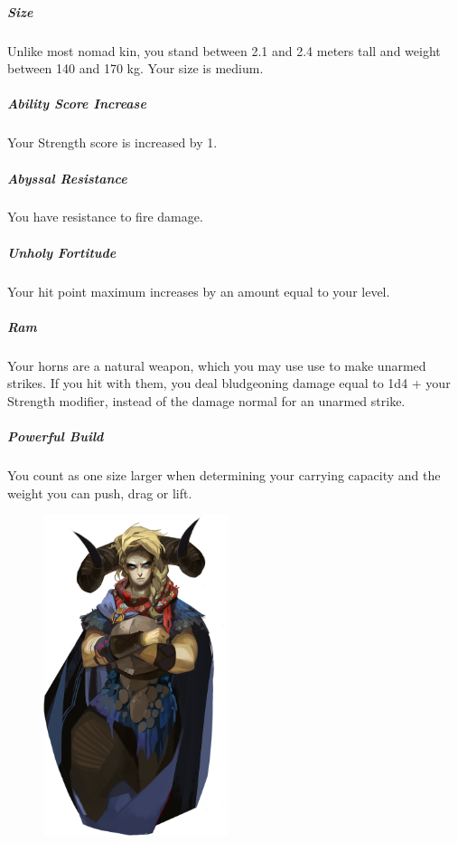     \subparagraph{Size} Unlike most nomad kin, you stand between 2.1 and 2.4 meters tall and weight between 140 and 170 kg.
    Your size is medium.

    \subparagraph{Ability Score Increase} Your Strength score is increased by 1.


    \subparagraph{Abyssal Resistance} You have resistance to fire damage.

    \subparagraph{Unholy Fortitude} Your hit point maximum increases by an amount equal to your level.

    \subparagraph{Ram} Your horns are a natural weapon, which you may use use to make unarmed strikes.
    If you hit with them, you deal bludgeoning damage equal to 1d4 + your Strength modifier, instead of the damage normal for an unarmed strike.

    \subparagraph{Powerful Build} You count as one size larger when determining your carrying capacity and the weight you can push, drag or lift.

\begin{figure}[!b]
    \centering
    \includegraphics[width=0.48\textwidth]{04kins/img/19uman_cursed.png}
\end{figure}

\newpage

